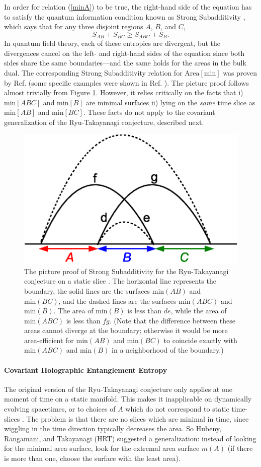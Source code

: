 \documentclass{article}
\begin{document}
In order for relation (\ref{minA}) to be true, the right-hand side of the equation has to satisfy the quantum information condition known as Strong Subadditivity \cite{LR73}, which says that for any three disjoint regions $A$, $B$, and $C$,
\begin{equation}
S_{AB} + S_{BC} \ge S_{ABC} + S_{B}.
\end{equation}
In quantum field theory, each of these entropies are divergent, but the divergences cancel on the left- and right-hand sides of the equation since both sides share the same boundaries---and the same holds for the areas in the bulk dual.  The corresponding Strong Subadditivity relation for $\mathrm{Area}[\mathrm{min}]$ was proven by Ref. \cite{HT07} (some specific examples were shown in Ref. \cite{HiT07}).  The picture proof follows almost trivially from Figure \ref{SSAfig}.  However, it relies critically on the facts that i) $\mathrm{min}[ABC]$ and $\mathrm{min}[B]$ are minimal surfaces ii) lying on the \emph{same} time slice as $\mathrm{min}[AB]$ and $\mathrm{min}[BC]$.  These facts do not apply to the covariant generalization of the Ryu-Takayanagi conjecture, described next.
\begin{figure}[ht]
\centering
\includegraphics[width=.5\textwidth]{SSA2.eps}
\caption{\footnotesize The picture proof of Strong Subadditivity for the Ryu-Takayanagi conjecture on a static slice \cite{HT07}.  The horizontal line represents the boundary, the solid lines are the surfaces $\mathrm{min}(AB)$ and $\mathrm{min}(BC)$, and the dashed lines are the surfaces $\mathrm{min}(ABC)$ and $\mathrm{min}(B)$.  The area of $\mathrm{min}(B)$ is less than $de$, while the area of $\mathrm{min}(ABC)$ is less than $fg$.  (Note that the difference between these areas cannot diverge at the boundary; otherwise it would be more area-efficient for $\mathrm{min}(AB)$ and $\mathrm{min}(BC)$ to coincide exactly with $\mathrm{min}(ABC)$ and $\mathrm{min}(B)$ in a neighborhood of the boundary.)}\label{SSAfig}
\end{figure}
\paragraph{Covariant Holographic Entanglement Entropy} The original version of the Ryu-Takayanagi conjecture only applies at one moment of time on a static manifold.  This makes it inapplicable on dynamically evolving spacetimes, or to choices of $A$ which do not correspond to static time-slices \cite{CHH12}.  The problem is that there are no slices which are minimal in time, since wiggling in the time direction typically decreases the area.  So Hubeny, Rangamani, and Takayanagi (HRT) \cite{HRT07} suggested a generalization: instead of looking for the minimal area surface, look for the extremal area surface $m(A)$ (if there is more than one, choose the surface with the least area).   
\end{document}
